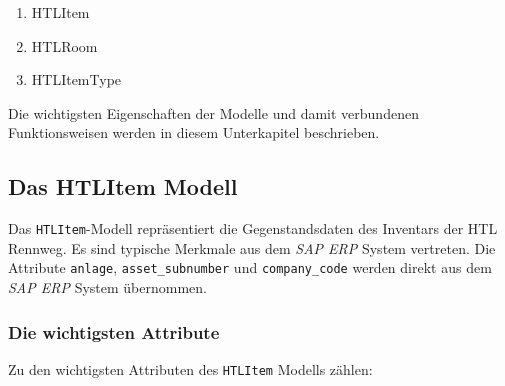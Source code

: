 \begin{enumerate}
\def\labelenumi{\arabic{enumi}.}
\tightlist
\item
  HTLItem
\item
  HTLRoom
\item
  HTLItemType
\end{enumerate}

Die wichtigsten Eigenschaften der Modelle und damit verbundenen
Funktionsweisen werden in diesem Unterkapitel beschrieben.

\hypertarget{das-htlitem-modell}{%
\subsection{Das HTLItem Modell}\label{das-htlitem-modell}}

Das \texttt{HTLItem}-Modell repräsentiert die Gegenstandsdaten des
Inventars der HTL Rennweg. Es sind typische Merkmale aus dem
\emph{SAP ERP}
System vertreten. Die Attribute \texttt{anlage},
\texttt{asset\_subnumber} und \texttt{company\_code} werden direkt aus
dem \emph{SAP ERP}
System übernommen.

\hypertarget{die-wichtigsten-attribute}{%
\subsubsection{Die wichtigsten
Attribute}\label{die-wichtigsten-attribute}}

Zu den wichtigsten Attributen des \texttt{HTLItem} Modells zählen:

